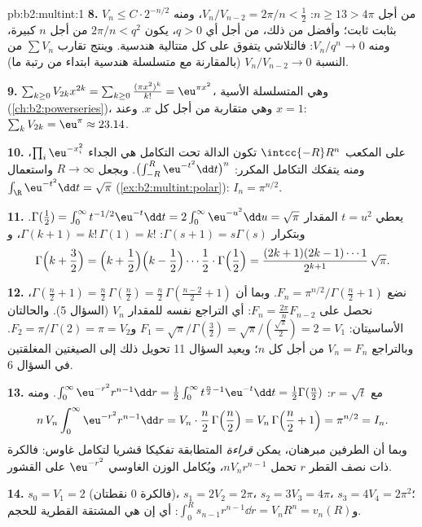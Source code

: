 \begin{solution}{pb:b2:multint:1}
\textbf{8.} من أجل $n \geq 13 > 4\pi$: $V_n/V_{n-2} = 2\pi/n <
\tfrac12$، ومنه $V_{n} \leq C\cdot 2^{-n/2}$ بثابت ثابت؛ وأفضل
من ذلك، من أجل أي $q > 0$، يكون $2\pi/n < q^2$ من أجل $n$ كبيرة، ومنه
$V_n/q^n \to 0$: فالتلاشي يتفوق على كل متتالية هندسية. وينتج تقارب $\sum V_n$
من النسبة $V_n/V_{n-2} \to 0$ (بالمقارنة مع متسلسلة هندسية ابتداء من رتبة ما).

\textbf{9.} $\sum_{k\geq0}V_{2k}x^{2k} =
\sum_{k\geq0}\frac{(\pi x^2)^k}{k!} = \eu^{\pi x^2}$، وهي المتسلسلة الأسية (\cref{ch:b2:powerseries})، وهي متقاربة من
أجل كل $x$. وعند $x = 1$: $\sum_kV_{2k} = \eu^\pi \approx
23.14$.

\textbf{10.} على المكعب $\intcc{-R}R^n$ تكون الدالة تحت التكامل هي الجداء
$\prod_i\eu^{-x_i^2}$، ومنه يتفكك التكامل المكرر: $\bigl(\int_{-R}^R\eu^{-t^2}\dd t\bigr)^n$. وبجعل $R \to \infty$ واستعمال
$\int_\R\eu^{-t^2}\dd t = \sqrt\pi$
(\cref{ex:b2:multint:polar}): $I_n = \pi^{n/2}$.

\textbf{11.} يعطي $t = u^2$ المقدار $\Gamma(\tfrac12) =
\int_0^\infty t^{-1/2}\eu^{-t}\dd t =
2\int_0^\infty\eu^{-u^2}\dd u = \sqrt\pi$. وبتكرار $\Gamma(s+1) = s\Gamma(s)$: $\Gamma(k+1) = k!\,\Gamma(1) =
k!$، و
\[
\Gamma\Bigl(k + \frac32\Bigr)
= \Bigl(k + \frac12\Bigr)\Bigl(k - \frac12\Bigr)\cdots
\frac12\cdot\Gamma\Bigl(\frac12\Bigr)
= \frac{(2k+1)(2k-1)\cdots1}{2^{k+1}}\,\sqrt\pi .
\]

\textbf{12.} نضع $F_n = \pi^{n/2}/\Gamma(\frac n2 + 1)$. وبما أن $\Gamma(\frac n2 + 1) = \frac n2\,\Gamma(\frac n2) =
\frac n2\,\Gamma(\frac{n-2}2 + 1)$، نحصل على $F_n =
\frac{2\pi}nF_{n-2}$: أي
التراجع نفسه للمقدار $V_n$ (السؤال 5). والحالتان الأساسيتان:
$F_1 = \sqrt\pi/\Gamma(\frac32) =
\sqrt\pi/(\frac{\sqrt\pi}2) = 2 = V_1$ و$F_2 =
\pi/\Gamma(2) = \pi = V_2$. وبالتراجع $V_n = F_n$ من أجل كل $n$؛ ويعيد السؤال
11 تحويل ذلك إلى الصيغتين المغلقتين في السؤال 6.

\textbf{13.} مع $r = \sqrt t$: $\int_0^\infty
\eu^{-r^2}r^{n-1}\dd r = \frac12\int_0^\infty
t^{\frac n2 - 1}\eu^{-t}\dd t = \frac12\Gamma(\frac n2)$. ومنه
\[
n\,V_n\int_0^\infty\eu^{-r^2}r^{n-1}\dd r
= V_n\cdot\frac n2\,\Gamma\Bigl(\frac n2\Bigr)
= V_n\,\Gamma\Bigl(\frac n2 + 1\Bigr) = \pi^{n/2} = I_n .
\]
وبما أن الطرفين مبرهنان، يمكن \emph{قراءة} المتطابقة تفكيكا قشريا
لتكامل غاوس: فالكرة ذات نصف القطر $r$ تحمل  $nV_nr^{n-1}$،
ويُكامل الوزن الغاوسي $\eu^{-r^2}$ على القشور.

\textbf{14.} $s_0 = V_1 = 2$ (فالكرة $0$ نقطتان)، $s_1 = 2V_2 = 2\pi$، $s_2 = 3V_3 = 4\pi$،
$s_3 = 4V_4 =
2\pi^2$؛ و$\int_0^R s_{n-1}r^{n-1}\dd r = V_nR^n =
v_n(R)$: أي إن  هي المشتقة القطرية للحجم.


\end{solution}
